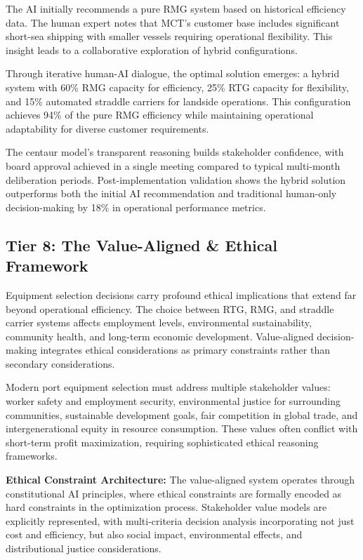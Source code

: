 \documentclass{article}
\begin{document}
The AI initially recommends a pure RMG system based on historical efficiency data. The human expert notes that MCT's customer base includes significant short-sea shipping with smaller vessels requiring operational flexibility. This insight leads to a collaborative exploration of hybrid configurations.

Through iterative human-AI dialogue, the optimal solution emerges: a hybrid system with 60\% RMG capacity for efficiency, 25\% RTG capacity for flexibility, and 15\% automated straddle carriers for landside operations. This configuration achieves 94\% of the pure RMG efficiency while maintaining operational adaptability for diverse customer requirements.

The centaur model's transparent reasoning builds stakeholder confidence, with board approval achieved in a single meeting compared to typical multi-month deliberation periods. Post-implementation validation shows the hybrid solution outperforms both the initial AI recommendation and traditional human-only decision-making by 18\% in operational performance metrics.

\subsection{Tier 8: The Value-Aligned \& Ethical Framework}

Equipment selection decisions carry profound ethical implications that extend far beyond operational efficiency. The choice between RTG, RMG, and straddle carrier systems affects employment levels, environmental sustainability, community health, and long-term economic development. Value-aligned decision-making integrates ethical considerations as primary constraints rather than secondary considerations.

Modern port equipment selection must address multiple stakeholder values: worker safety and employment security, environmental justice for surrounding communities, sustainable development goals, fair competition in global trade, and intergenerational equity in resource consumption. These values often conflict with short-term profit maximization, requiring sophisticated ethical reasoning frameworks.

\textbf{Ethical Constraint Architecture:}
The value-aligned system operates through constitutional AI principles, where ethical constraints are formally encoded as hard constraints in the optimization process. Stakeholder value models are explicitly represented, with multi-criteria decision analysis incorporating not just cost and efficiency, but also social impact, environmental effects, and distributional justice considerations.
\end{document}
